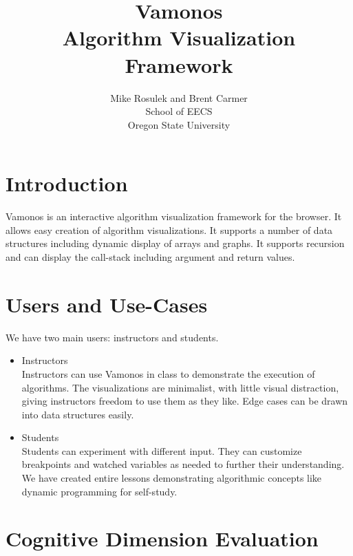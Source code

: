 \documentclass[12pt]{article}
\begin{document}
\title{\textbf{Vamonos}
\\ Algorithm Visualization Framework}

\author{Mike Rosulek and Brent Carmer \\
School of EECS \\
Oregon State University
}

\maketitle

\section{Introduction}
\label{sec:intro}

Vamonos is an interactive algorithm visualization framework for the browser. It allows easy creation
of algorithm visualizations. It supports a number of data structures including dynamic display of
arrays and graphs. It supports recursion and can display the call-stack including argument and
return values.

\section{Users and Use-Cases}
\label{sec:users}

We have two main users: instructors and students.

\begin{itemize}
\item Instructors\\

  Instructors can use Vamonos in class to demonstrate the execution of algorithms. The
  visualizations are minimalist, with little visual distraction, giving instructors freedom to use
  them as they like. Edge cases can be drawn into data structures easily.

\item Students\\

  Students can experiment with different input. They can customize breakpoints and watched variables
  as needed to further their understanding. We have created entire lessons demonstrating algorithmic
  concepts like dynamic programming for self-study.

\end{itemize}

\section{Cognitive Dimension Evaluation}
\label{sec:cogdim}
\end{document}
